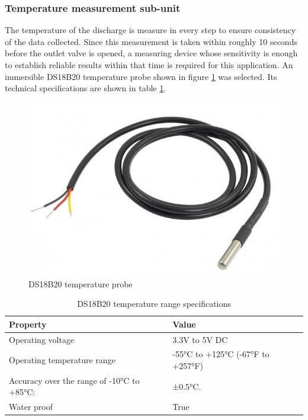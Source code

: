 \subsubsection{Temperature measurement sub-unit}
 The temperature of the discharge is measure in every step to ensure consistency of the data collected. Since this measurement is taken within roughly 10 seconds before the outlet valve is opened, a measuring device whose sensitivity is enough to establish reliable results within that time is required for this application. An immersible DS18B20 temperature probe shown in figure \ref{fig:ds18b20_temperature} was selected. Its technical specifications are shown in table \ref{tab:ds18b20 temperature probe}.
\begin{figure}[H]
    \centering
    \includegraphics[width=.28\textwidth, height=.28\textheight]{Figures/ds18b20_temperature_probe.jpg}
    \caption[DS18B20 temperature probe]{DS18B20 temperature probe \cite{ds18b20}}
    \label{fig:ds18b20_temperature}
\end{figure}
\begin{table}[H]
\centering
\caption[DS18B20 temperature range specifications]{DS18B20 temperature range specifications \cite{ds18b20}}
\begin{tabular}{|l|l|}
\hline
\textbf{Property} & \textbf{Value} \\ \hline
Operating voltage & 3.3V  to 5V DC \\ \hline
Operating temperature range & -55°C to +125°C (-67°F to +257°F) \\ \hline
Accuracy over the range of -10°C to +85°C: & ±0.5°C. \\ \hline
Water proof & True \\ \hline
\end{tabular}
\label{tab:ds18b20 temperature probe}
\end{table}

